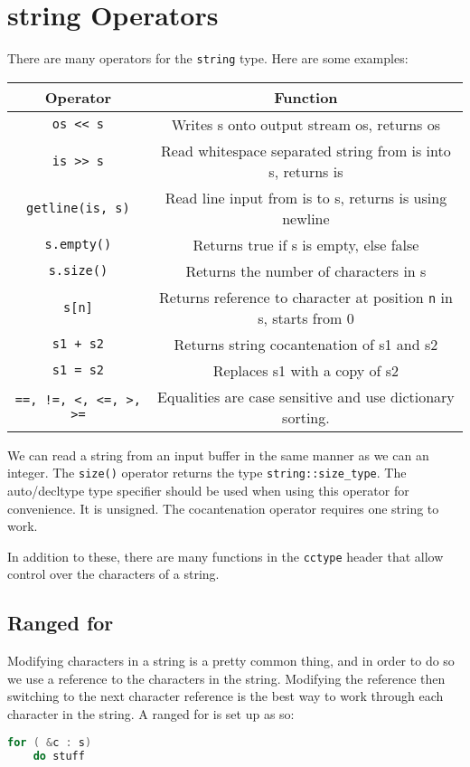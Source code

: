 \documentclass[12pt, a4paper]{report}
\begin{document}
\section{string Operators}
There are many operators for the \verb|string| type. Here are some examples:
\begin{center}
  \begin{tabular}{ |c|c| }
    \hline
    \textbf{Operator} & \textbf{Function} \\
    \hline
    \verb|os << s| & Writes s onto output stream os, returns os \\
    \hline
    \verb|is >> s| & Read whitespace separated string from is into s, returns is \\
    \hline
    \verb|getline(is, s)| & Read line input from is to s, returns is using newline \\
    \hline
    \verb|s.empty()| & Returns true if s is empty, else false \\
    \hline
    \verb|s.size()| & Returns the number of characters in s \\
    \hline
    \verb|s[n]| & Returns reference to character at position \verb|n| in s, starts from 0 \\
    \hline
    \verb|s1 + s2| & Returns string cocantenation of s1 and s2 \\
    \hline
    \verb|s1 = s2| & Replaces s1 with a copy of s2 \\
    \hline
    \verb|==, !=, <, <=, >, >=| & Equalities are case sensitive and use dictionary sorting. \\
    \hline
  \end{tabular}
\end{center}
We can read a string from an input buffer in the same manner as we can an integer. The \verb|size()| operator returns the type \verb|string::size_type|.
The auto/decltype type specifier should be used when using this operator for convenience. It is unsigned.
The cocantenation operator requires one string to work. 

In addition to these, there are many functions in the \verb|cctype| header that allow control over the characters of a string.
\subsection{Ranged for}
Modifying characters in a string is a pretty common thing, and in order to do so we use a reference to the characters in the string.
Modifying the reference then switching to the next character reference is the best way to work through each character in the string.
A ranged for is set up as so:
\begin{lstlisting}[language=C++]
for ( &c : s)
    do stuff
\end{lstlisting}
\end{document}
